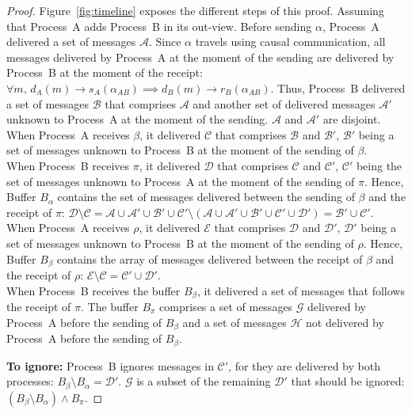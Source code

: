 \begin{proof}
  Figure~\ref{fig:timeline} exposes the different steps of this proof. Assuming
  that Process~A adds Process~B in its out-view. Before sending $\alpha$,
  Process~A delivered a set of messages $\mathcal{A}$. Since $\alpha$ travels
  using causal communication, all messages delivered by Process~A at the moment
  of the sending are delivered by Process~B at the moment of the receipt:
  $\forall m,\, d_A(m) \rightarrow s_A(\alpha_{AB}) \implies d_B(m) \rightarrow
  r_B(\alpha_{AB})$.
  Thus, Process~B delivered a set of messages $\mathcal{B}$ that comprises
  $\mathcal{A}$ and another set of delivered messages $\mathcal{A}'$ unknown to
  Process~A at the moment of the sending. $\mathcal{A}$ and $\mathcal{A}'$ are
  disjoint.\\
  When Process~A receives $\beta$, it delivered $\mathcal{C}$ that comprises
  $\mathcal{B}$ and $\mathcal{B}'$, $\mathcal{B}'$ being a set of messages
  unknown to Process~B at the moment of the sending of $\beta$. \\
  When Process~B receives $\pi$, it delivered $\mathcal{D}$ that comprises
  $\mathcal{C}$ and $\mathcal{C}'$, $\mathcal{C}'$ being the set of messages
  unknown to Process~A at the moment of the sending of $\pi$. Hence, Buffer
  $B_\alpha$ contains the set of messages delivered between the sending of
  $\beta$ and the receipt of $\pi$:
  $\mathcal{D} \setminus \mathcal{C} = \mathcal{A} \cup \mathcal{A}' \cup
  \mathcal{B}' \cup \mathcal{C}' \setminus (\mathcal{A} \cup \mathcal{A'} \cup
  \mathcal{B}' \cup \mathcal{C'} \cup \mathcal{D}') = \mathcal{B}' \cup
  \mathcal{C}'$. \\
  When Process~A receives $\rho$, it delivered $\mathcal{E}$ that comprises
  $\mathcal{D}$ and $\mathcal{D}'$, $\mathcal{D}'$ being a set of messages
  unknown to Process~B at the moment of the sending of $\rho$. Hence, Buffer
  $B_\beta$ contains the array of messages delivered between the receipt of
  $\beta$ and the receipt of $\rho$:
  $\mathcal{E} \setminus \mathcal{C} = \mathcal{C}' \cup \mathcal{D}'$.\\
  When Process~B receives the buffer $B_\beta$, it delivered a set of messages
  that follows the receipt of $\pi$. The buffer $B_\pi$ comprises a set of
  messages $\mathcal{G}$ delivered by Process~A before the sending of $B_\beta$
  and a set of messages $\mathcal{H}$ not delivered by Process~A before the
  sending of $B_\beta$. 
  
  \noindent\textbf{To ignore:} Process~B ignores messages in $\mathcal{C}'$,
  for they are
  delivered by both processes: $B_\beta \setminus B_\alpha = \mathcal{D}'$.
  $\mathcal{G}$ is a subset of the remaining $\mathcal{D}'$ that should be
  ignored: $(B_\beta \setminus B_\alpha) \wedge B_\pi$.


\end{proof}
